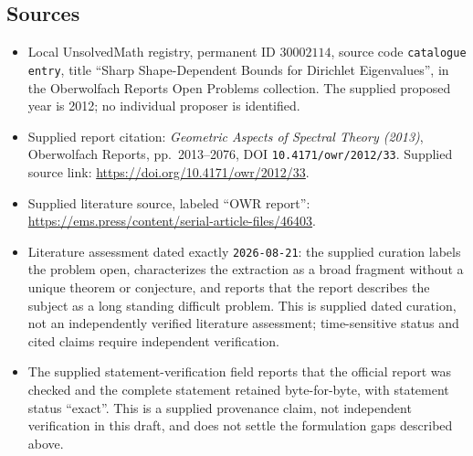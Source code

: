 \documentclass[11pt]{article}
\begin{document}
\subsection{Sources}
\begin{itemize}
\item Local UnsolvedMath registry, permanent ID \(30002114\), source code \texttt{catalogue entry}, title ``Sharp Shape-Dependent Bounds for Dirichlet Eigenvalues'', in the Oberwolfach Reports Open Problems collection. The supplied proposed year is 2012; no individual proposer is identified.
\item Supplied report citation: \emph{Geometric Aspects of Spectral Theory (2013)}, Oberwolfach Reports, pp.\ 2013--2076, DOI \texttt{10.4171/owr/2012/33}. Supplied source link: \url{https://doi.org/10.4171/owr/2012/33}.
\item Supplied literature source, labeled ``OWR report'': \url{https://ems.press/content/serial-article-files/46403}.
\item Literature assessment dated exactly \texttt{2026-08-21}: the supplied curation labels the problem open, characterizes the extraction as a broad fragment without a unique theorem or conjecture, and reports that the report describes the subject as a long standing difficult problem. This is supplied dated curation, not an independently verified literature assessment; time-sensitive status and cited claims require independent verification.
\item The supplied statement-verification field reports that the official report was checked and the complete statement retained byte-for-byte, with statement status ``exact''. This is a supplied provenance claim, not independent verification in this draft, and does not settle the formulation gaps described above.
\end{itemize}
\end{document}
